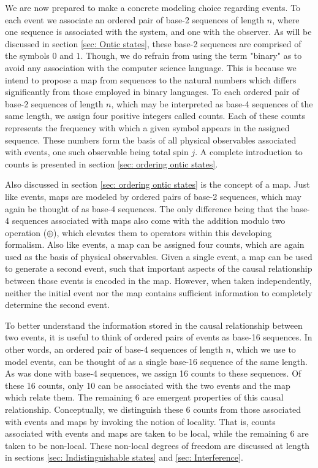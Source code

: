 \documentclass{article}
\begin{document}
We are now prepared to make a concrete modeling choice regarding events. To each event we associate an ordered pair of base-2 sequences of length $n$, where one sequence is associated with the system, and one with the observer. As will be discussed in section \ref{sec: Ontic states}, these base-2 sequences are comprised of the symbols $0$ and $1$. Though, we do refrain from using the term "binary" as to avoid any association with the computer science language. This is because we intend to propose a map from sequences to the natural numbers which differs significantly from those employed in binary languages. To each ordered pair of base-2 sequences of length $n$, which may be interpreted as base-4 sequences of the same length, we assign four positive integers called counts. Each of these counts represents the frequency with which a given symbol appears in the assigned sequence. These numbers form the basis of all physical observables associated with events, one such observable being total spin $j$. A complete introduction to counts is presented in section \ref{sec: ordering ontic states}.

Also discussed in section \ref{sec: ordering ontic states} is the concept of a map. Just like events, maps are modeled by ordered pairs of base-2 sequences, which may again be thought of as base-4 sequences. The only difference being that the base-4 sequences associated with maps also come with the addition modulo two operation ($\oplus$), which elevates them to operators within this developing formalism. Also like events, a map can be assigned four counts, which are again used as the basis of physical observables. Given a single event, a map can be used to generate a second event, such that important aspects of the causal relationship between those events is encoded in the map. However, when taken independently, neither the initial event nor the map contains sufficient information to completely determine the second event.

To better understand the information stored in the causal relationship between two events, it is useful to think of ordered pairs of events as base-16 sequences. In other words, an ordered pair of base-4 sequences of length $n$, which we use to model events, can be thought of as a single base-16 sequence of the same length. As was done with base-4 sequences, we assign 16 counts to these sequences. Of these 16 counts, only 10 can be associated with the two events and the map which relate them. The remaining 6 are emergent properties of this causal relationship. Conceptually, we distinguish these 6 counts from those associated with events and maps by invoking the notion of locality. That is, counts associated with events and maps are taken to be local, while the remaining 6 are taken to be non-local. These non-local degrees of freedom are discussed at length in sections \ref{sec: Indistinguishable states} and \ref{sec: Interference}.
\end{document}
